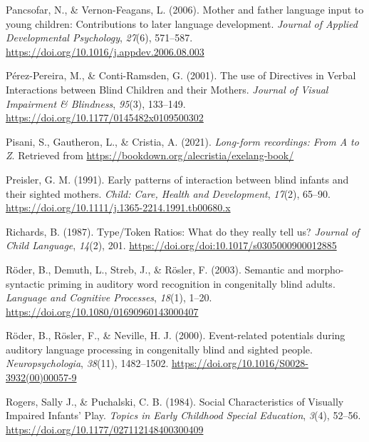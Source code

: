 \documentclass[
  man]{apa6}
\newlength{\cslhangindent}
\newlength{\cslentryspacingunit} %
\newenvironment{CSLReferences}[2] %
 {%
  \setlength{\parindent}{0pt}
  \ifodd #1
  \let\oldpar\par
  \def\par{\hangindent=\cslhangindent\oldpar}
  \fi
  \setlength{\parskip}{#2\cslentryspacingunit}
 }%
 {}
\begin{document}
\begin{CSLReferences}{1}{0}
\leavevmode{}%
Pancsofar, N., \& Vernon-Feagans, L. (2006). Mother and father language input to young children: {Contributions} to later language development. \emph{Journal of Applied Developmental Psychology}, \emph{27}(6), 571--587. \url{https://doi.org/10.1016/j.appdev.2006.08.003}

\leavevmode{}%
Pérez-Pereira, M., \& Conti-Ramsden, G. (2001). The use of {Directives} in {Verbal} {Interactions} between {Blind} {Children} and their {Mothers}. \emph{Journal of Visual Impairment \& Blindness}, \emph{95}(3), 133--149. \url{https://doi.org/10.1177/0145482x0109500302}

\leavevmode{}%
Pisani, S., Gautheron, L., \& Cristia, A. (2021). \emph{Long-form recordings: {From} {A} to {Z}}. Retrieved from \url{https://bookdown.org/alecristia/exelang-book/}

\leavevmode{}%
Preisler, G. M. (1991). Early patterns of interaction between blind infants and their sighted mothers. \emph{Child: Care, Health and Development}, \emph{17}(2), 65--90. \url{https://doi.org/10.1111/j.1365-2214.1991.tb00680.x}

\leavevmode{}%
Richards, B. (1987). Type/{Token} {Ratios}: What do they really tell us? \emph{Journal of Child Language}, \emph{14}(2), 201. \url{https://doi.org/doi:10.1017/s0305000900012885}

\leavevmode{}%
Röder, B., Demuth, L., Streb, J., \& Rösler, F. (2003). Semantic and morpho-syntactic priming in auditory word recognition in congenitally blind adults. \emph{Language and Cognitive Processes}, \emph{18}(1), 1--20. \url{https://doi.org/10.1080/01690960143000407}

\leavevmode{}%
Röder, B., Rösler, F., \& Neville, H. J. (2000). Event-related potentials during auditory language processing in congenitally blind and sighted people. \emph{Neuropsychologia}, \emph{38}(11), 1482--1502. \url{https://doi.org/10.1016/S0028-3932(00)00057-9}

\leavevmode{}%
Rogers, Sally J., \& Puchalski, C. B. (1984). Social {Characteristics} of {Visually} {Impaired} {Infants}' {Play}. \emph{Topics in Early Childhood Special Education}, \emph{3}(4), 52--56. \url{https://doi.org/10.1177/027112148400300409}


\end{CSLReferences}
\end{document}
